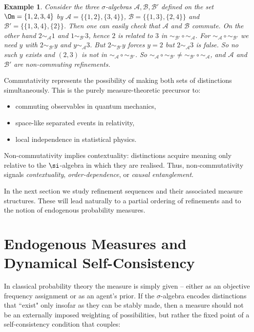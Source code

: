 \documentclass[
 amsmath,amssymb,
  onecolumn %
]{revtex4-2}
\newtheorem{example}[theorem]{Example}
\newcommand{\Aa}{{\mathcal A}}  %
\newcommand{\Bb}{{\mathcal B}}
\begin{document}
\medskip

\begin{example}\label{ex:NC} Consider the three $\sigma$-algebras $\Aa, \Bb, \Bb'$ defined on the set $\Om = \{1,2,3,4\}$ by $\Aa = \{ \{ 1,2\} , \{ 3,4\} \}$, $\Bb = \{ \{ 1,3\} , \{ 2,4\} \}$ and $\Bb' = \{ \{ 1,3,4\} , \{ 2\}\}$.  Then one can easily check that $\Aa$ and $\Bb$ commute.  On the other hand $2\sim_{\Aa} 1$ and $1 \sim_{\Bb'} 3$, hence $2$ is related to $3$ in $\sim_{\Bb'} \circ \sim_{\Aa}$. For $\sim_{\Aa} \circ \sim_{\Bb'}$ we need $y$ with $2\sim_{\Bb'} y$ and $y\sim_{\Aa} 3$. But $2\sim_{\Bb'} y$ forces $y =2$ but $2\sim_{\Aa} 3$ is false. So no such $y$ exists and $(2,3)$ is not in $\sim_{\Aa} \circ \sim_{\Bb'}$. So $\sim_{\Aa} \circ \sim_{\Bb'} \neq \sim_{\Bb'} \circ \sim_{\Aa}$, and $\Aa$ and $\Bb'$ are non-commuting refinements.
\end{example} 



\noindent Commutativity represents the possibility of making both sets of distinctions simultaneously. This is the purely measure-theoretic precursor to:
\begin{itemize}[leftmargin=2em]
\item commuting observables in quantum mechanics,
\item space-like separated events in relativity,
\item local independence in statistical physics.
\end{itemize}
 Non-commutativity implies contextuality: distinctions acquire meaning only relative to the $\si$-algebra in which they are realised. Thus, non-commutativity signals \emph{contextuality}, \emph{order-dependence}, or \emph{causal entanglement}.


In the next section we study refinement sequences and their associated measure structures. These will lead naturally to a partial ordering of refinements and to the notion of endogenous probability measures.




\section{Endogenous Measures and Dynamical Self-Consistency}\label{sec3} 
In classical probability theory the measure is simply given -- either as an objective frequency assignment or as an agent’s prior. If the $\sigma$-algebra encodes distinctions that ``exist" only insofar as they can be stably made, then a measure should not be an externally imposed weighting of possibilities, but rather the fixed point of a self-consistency condition that couples:
\end{document}
